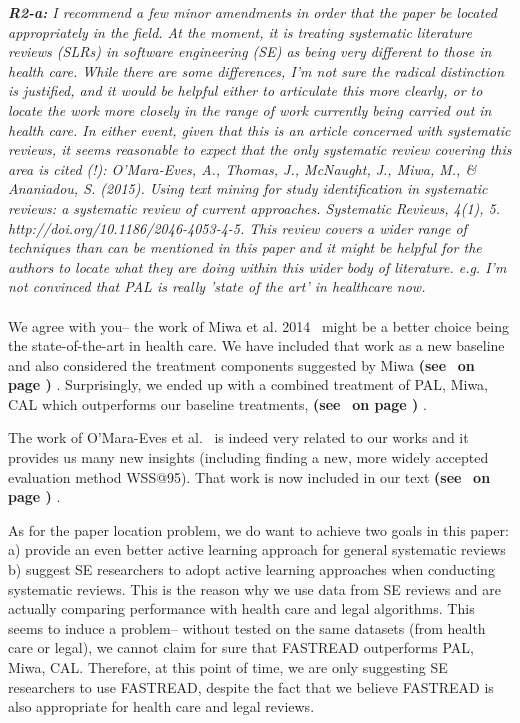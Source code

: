 \documentclass{svjour3}
\theoremstyle{break}
\newcommand{\review}[1]{{\textit{#1}}~\\}
\newcommand{\citeresp}[1]{
{\bf (see } \fcolorbox{black}{black!15}{
 \bf
  \scriptsize R-{#1}}~{\bf{on page \pageref{response:#1})}}
}
\begin{document}
  
\review{\textbf{R2-a:} I recommend a few minor amendments in order that the paper be located appropriately in the field. At the moment, it is treating systematic literature reviews (SLRs) in software engineering (SE) as being very different to those in health care. While there are some differences, I'm not sure the radical distinction is justified, and it would be helpful either to articulate this more clearly, or to locate the work more closely in the range of work currently being carried out in health care. In either event, given that this is an article concerned with systematic reviews, it seems reasonable to expect that the only systematic review covering this area is cited (!): O'Mara-Eves, A., Thomas, J., McNaught, J., Miwa, M., \& Ananiadou, S. (2015). Using text mining for study identification in systematic reviews: a systematic review of current approaches. Systematic Reviews, 4(1), 5. http://doi.org/10.1186/2046-4053-4-5. This review covers a wider range of techniques than can be mentioned in this paper and it might be helpful for the authors to locate what they are doing within this wider body of literature. e.g. I'm not convinced that PAL is really 'state of the art' in healthcare now.}
~\\

We agree with you-- the work of Miwa et al. 2014~\cite{miwa2014reducing} might be a better choice being the state-of-the-art in health care. We have included that work as a new baseline and also considered the treatment components suggested by Miwa \citeresp{1a1}. Surprisingly, we ended up with a combined treatment of PAL, Miwa, CAL which outperforms our baseline treatments, \citeresp{1a2}.  

The work of O'Mara-Eves et al.~\cite{o2015using} is indeed very related to our works and it provides us many new insights (including finding a new, more widely accepted evaluation method WSS@95). That work is now included in our text \citeresp{2a}.

As for the paper location problem, we do want to achieve two goals in this paper: a) provide an even better active learning approach for general systematic reviews b) suggest SE researchers to adopt active learning approaches when conducting systematic reviews. This is the reason why we use data from SE reviews and are actually comparing performance with health care and legal algorithms. This seems to induce a problem-- without tested on the same datasets (from health care or legal), we cannot claim for sure that FASTREAD outperforms PAL, Miwa, CAL. Therefore, at this point of time, we are only suggesting SE researchers to use FASTREAD, despite the fact that we believe FASTREAD is also appropriate for health care and legal reviews. 
\end{document}
